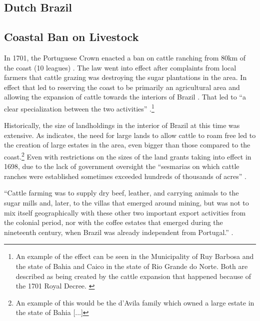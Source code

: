 \documentclass{article}
\begin{document}
\subsection{Dutch Brazil}

\subsection{Coastal Ban on Livestock}

In 1701, the Portuguese Crown enacted a ban on cattle ranching from 80km of the coast (10 leagues) \parencites[p~.40]{Fausto2014-bh}[p~.198]{Simonsen2005-ps}[p~.460]{Bethell1984-of}. 
The law went into effect after complaints from local farmers that cattle grazing was destroying the sugar plantations in the area. 
In effect that led to reserving the coast to be primarily an agricultural area and allowing the expansion of cattle towards the interiors of Brazil \parencite[p.~216]{Junior1967-jv}.
That led to ``a clear specialization between the two activities'' \parencite{Ribeiro2012-lb}.\footnote{An example of the effect can be seen in the Municipality of Ruy Barbosa and the state of Bahia and Caico in the state of Rio Grande do Norte. Both are described as being created by the cattle expansion that happened because of the 1701 Royal Decree. \parencite{UnknownUnknown-ro}}


Historically, the size of landholdings in the interior of Brazil at this time was extensive. 
As \textcite[p~.41]{Fausto2014-bh} indicates, the need for large lands to allow cattle to roam free led to the creation of large estates in the area, even bigger than those compared to the coast.\footnote{An example of this would be the d'Avila family which owned a large estate in the state of Bahia [...]}
Even with restrictions on the sizes of the land grants taking into effect in 1698, due to the lack of government oversight the  ``sesmarias on which cattle ranches were established sometimes exceeded hundreds of thousands of acres'' \parencite{Bethell1984-of}.


\parencite[p~.]{Boxer1962-bj}

``Cattle farming was to supply dry beef, leather, and carrying animals to the sugar mills and, later, to the villas that emerged around mining, but was not to mix itself geographically with these other two important export activities from the colonial period, nor with the coffee estates that emerged during the nineteenth century,  when  Brazil was already independent from  Portugal.'' \parencite{Ribeiro2012-lb}.
\end{document}
